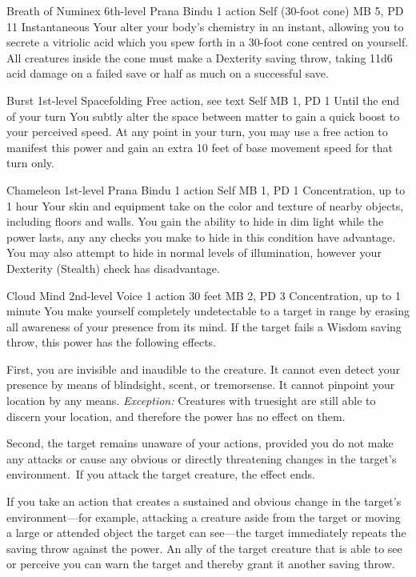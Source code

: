 \DndPowerHeader%
  {Breath of Numinex}
  {6th-level Prana Bindu}
  {1 action}
  {Self (30-foot cone)}
  {MB 5, PD 11}
  {Instantaneous}
Your alter your body's chemistry in an instant,
allowing you to secrete a vitriolic acid
which you spew forth in a 30-foot cone
centred on yourself.
All creatures inside the cone must make a
Dexterity saving throw,
taking 11d6 acid damage on a failed save
or half as much on a successful save. 

\DndPowerHeader%
  {Burst}
  {1st-level Spacefolding}
  {Free action, see text}
  {Self}
  {MB 1, PD 1}
  {Until the end of your turn}
You subtly alter the space between matter
to gain a quick boost to your perceived speed.
At any point in your turn,
you may use a free action to manifest this power
and gain an extra 10 feet of base movement speed
for that turn only.

\DndPowerHeader%
  {Chameleon}
  {1st-level Prana Bindu}
  {1 action}
  {Self}
  {MB 1, PD 1}
  {Concentration, up to 1 hour}
  Your skin and equipment take on the color and texture
  of nearby objects,
  including floors and walls.
  You gain the ability to hide in dim light
  while the power lasts,
  any any checks you make to hide in this
  condition have advantage.
  You may also attempt to hide in normal levels
  of illumination,
  however your Dexterity (Stealth) check has disadvantage.

\DndPowerHeader%
  {Cloud Mind}
  {2nd-level Voice}
  {1 action}
  {30 feet}
  {MB 2, PD 3}
  {Concentration, up to 1 minute}
You make yourself completely undetectable to a target in range
by erasing all awareness of your presence from its mind.
If the target fails a Wisdom saving throw,
this power has the following effects.

First, you are invisible and inaudible to the creature.
It cannot even detect your presence by means of blindsight,
scent, or tremorsense.
It cannot pinpoint your location by any means.
\textit{Exception:} Creatures with truesight are still
able to discern your location,
and therefore the power has no effect on them.
  
Second, the target remains unaware of your actions,
provided you do not make any attacks or cause any obvious
or directly threatening changes in the target's environment.\
If you attack the target creature, the effect ends.
  
If you take an action that creates a sustained and obvious change
in the target's environment---for example, attacking a creature
aside from the target or moving a large or attended object
the target can see---the target immediately repeats the
saving throw against the power.
An ally of the target creature that is able to see or perceive you
can warn the target and thereby grant it another saving throw.

